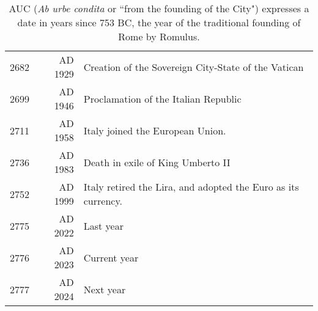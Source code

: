 \documentclass{article}
\begin{document}
\begin{table}[htbp]
\begin{tabular}{rrl}
2682  & AD 1929 & Creation of the Sovereign City-State of the Vatican \\
2699  & AD 1946 & Proclamation of the Italian Republic \\
2711  & AD 1958 & Italy joined the European Union. \\
2736  & AD 1983 & Death in exile of King Umberto II \\
2752  & AD 1999 & Italy retired the Lira, and adopted the Euro as its currency. \\
2775  & AD 2022 & Last year \\
2776  & AD 2023 & Current year \\
2777  & AD 2024 & Next year \\
\bottomrule
\end{tabular}%
\caption*{\footnotesize AUC (\emph{Ab urbe condita} or ``from the founding of the City") expresses a date in years since 753 BC, the year of the traditional founding of Rome by Romulus.}
\label{tab:addlabel}%
\end{table}%
\end{document}
